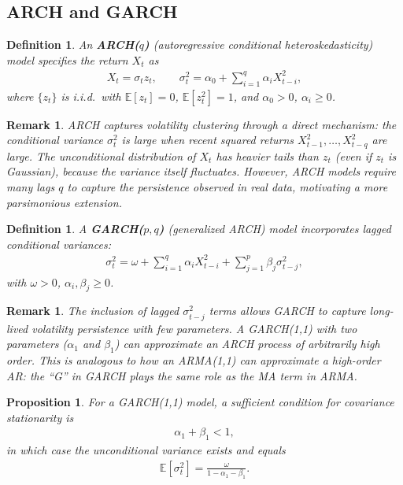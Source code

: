 \documentclass{report}
\theoremstyle{spacedplain}
\newtheorem{proposition}[theorem]{Proposition}
\theoremstyle{spaceddefinition}
\newtheorem{definition}[theorem]{Definition}
\theoremstyle{spacedremark}
\newtheorem{remark}[theorem]{Remark}
\begin{document}
\subsection{ARCH and GARCH}

\begin{definition}
An \textbf{ARCH($q$)} (autoregressive conditional heteroskedasticity) model specifies the return $X_t$ as
\begin{align}
    X_t = \sigma_t z_t, \qquad \sigma_t^2 = \alpha_0 + \sum_{i=1}^q \alpha_i X_{t-i}^2,
\end{align}
where $\{z_t\}$ is i.i.d.\ with $\mathbb{E}[z_t] = 0$, $\mathbb{E}[z_t^2] = 1$, and $\alpha_0 > 0$, $\alpha_i \geq 0$.
\end{definition}

\begin{remark}
ARCH captures volatility clustering through a direct mechanism: the conditional variance $\sigma_t^2$ is large when recent squared returns $X_{t-1}^2, \ldots, X_{t-q}^2$ are large. The unconditional distribution of $X_t$ has heavier tails than $z_t$ (even if $z_t$ is Gaussian), because the variance itself fluctuates. However, ARCH models require many lags $q$ to capture the persistence observed in real data, motivating a more parsimonious extension.
\end{remark}

\begin{definition}
A \textbf{GARCH($p,q$)} (generalized ARCH) model incorporates lagged conditional variances:
\begin{align}
    \sigma_t^2 = \omega + \sum_{i=1}^q \alpha_i X_{t-i}^2 + \sum_{j=1}^p \beta_j \sigma_{t-j}^2,
\end{align}
with $\omega > 0$, $\alpha_i, \beta_j \geq 0$.
\end{definition}

\begin{remark}
The inclusion of lagged $\sigma_{t-j}^2$ terms allows GARCH to capture long-lived volatility persistence with few parameters. A GARCH(1,1) with two parameters ($\alpha_1$ and $\beta_1$) can approximate an ARCH process of arbitrarily high order. This is analogous to how an ARMA(1,1) can approximate a high-order AR: the ``G'' in GARCH plays the same role as the MA term in ARMA.
\end{remark}

\begin{proposition}
For a GARCH(1,1) model, a sufficient condition for covariance stationarity is
\begin{align}
    \alpha_1 + \beta_1 < 1,
\end{align}
in which case the unconditional variance exists and equals
\begin{align}
    \mathbb{E}[\sigma_t^2] = \frac{\omega}{1 - \alpha_1 - \beta_1}.
\end{align}
\end{proposition}
\end{document}
